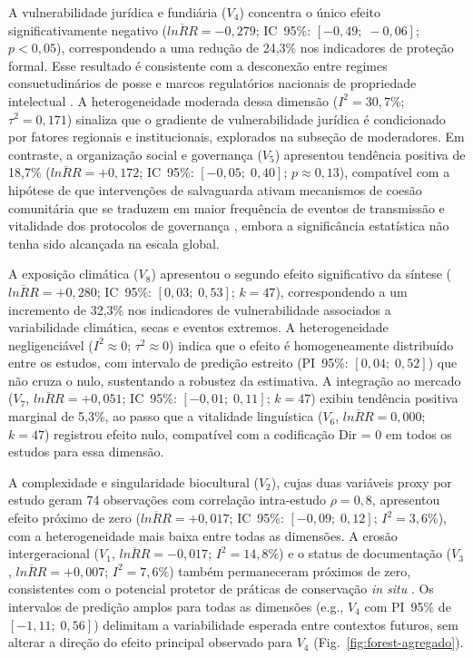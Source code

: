 \documentclass[12pt,a4paper]{article}
\begin{document}
A vulnerabilidade jurídica e fundiária ($V_4$) concentra o único efeito significativamente negativo ($\overline{lnRR} = -0{,}279$; IC~95\%: $[-0{,}49;\; -0{,}06]$; $p < 0{,}05$), correspondendo a uma redução de 24,3\% nos indicadores de proteção formal. Esse resultado é consistente com a desconexão entre regimes consuetudinários de posse e marcos regulatórios nacionais de propriedade intelectual \citep{Santilli2009,Dutfield2004,Cottier2004}. A heterogeneidade moderada dessa dimensão ($I^2 = 30{,}7\%$; $\tau^2 = 0{,}171$) sinaliza que o gradiente de vulnerabilidade jurídica é condicionado por fatores regionais e institucionais, explorados na subseção de moderadores. Em contraste, a organização social e governança ($V_5$) apresentou tendência positiva de 18,7\% ($\overline{lnRR} = +0{,}172$; IC~95\%: $[-0{,}05;\; 0{,}40]$; $p \approx 0{,}13$), compatível com a hipótese de que intervenções de salvaguarda ativam mecanismos de coesão comunitária que se traduzem em maior frequência de eventos de transmissão e vitalidade dos protocolos de governança \citep{Ostrom1990,Berkes2007,Rathwell2015}, embora a significância estatística não tenha sido alcançada na escala global.

A exposição climática ($V_8$) apresentou o segundo efeito significativo da síntese ($\overline{lnRR} = +0{,}280$; IC~95\%: $[0{,}03;\; 0{,}53]$; $k = 47$), correspondendo a um incremento de 32,3\% nos indicadores de vulnerabilidade associados a variabilidade climática, secas e eventos extremos. A heterogeneidade negligenciável ($I^2 \approx 0$; $\tau^2 \approx 0$) indica que o efeito é homogeneamente distribuído entre os estudos, com intervalo de predição estreito (PI~95\%: $[0{,}04;\; 0{,}52]$) que não cruza o nulo, sustentando a robustez da estimativa. A integração ao mercado ($V_7$, $\overline{lnRR} = +0{,}051$; IC~95\%: $[-0{,}01;\; 0{,}11]$; $k = 47$) exibiu tendência positiva marginal de 5,3\%, ao passo que a vitalidade linguística ($V_6$, $\overline{lnRR} = 0{,}000$; $k = 47$) registrou efeito nulo, compatível com a codificação Dir = 0 em todos os estudos para essa dimensão.

A complexidade e singularidade biocultural ($V_2$), cujas duas variáveis proxy por estudo geram 74 observações com correlação intra-estudo $\rho = 0{,}8$, apresentou efeito próximo de zero ($\overline{lnRR} = +0{,}017$; IC~95\%: $[-0{,}09;\; 0{,}12]$; $I^2 = 3{,}6\%$), com a heterogeneidade mais baixa entre todas as dimensões. A erosão intergeracional ($V_1$, $\overline{lnRR} = -0{,}017$; $I^2 = 14{,}8\%$) e o status de documentação ($V_3$, $\overline{lnRR} = +0{,}007$; $I^2 = 7{,}6\%$) também permaneceram próximos de zero, consistentes com o potencial protetor de práticas de conservação \textit{in situ} \citep{Brush2004}. Os intervalos de predição amplos para todas as dimensões (e.g., $V_4$ com PI~95\% de $[-1{,}11;\; 0{,}56]$) delimitam a variabilidade esperada entre contextos futuros, sem alterar a direção do efeito principal observado para $V_4$ (Fig.~\ref{fig:forest-agregado}).
\end{document}
